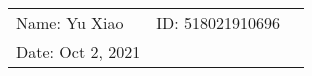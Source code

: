 \documentclass{article}
\begin{document}
\begin{spacing}{2.0}
\vspace*{0.25cm}
\hrulefill
\thispagestyle{empty}
\begin{center}
\begin{large}
\end{large}

\hrulefill


\vspace*{5cm}
\begin{Large}
\end{Large}
\vspace{2em}
\end{center}
\vfill

\begin{table}[h!]
\flushleft
\begin{tabular}{lll}
Name: Yu Xiao \hspace*{2em}&
ID: 518021910696 \hspace*{2em}\\

Date: Oct 2, 2021
\end{tabular}
\end{table}
\end{spacing}

\hfill
\end{document}
